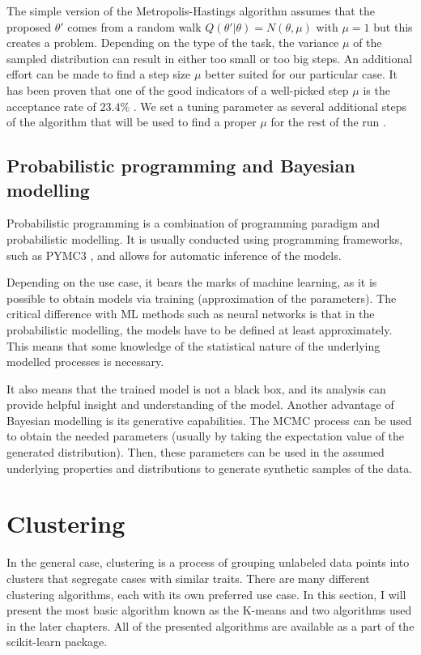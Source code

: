 The simple version of the Metropolis-Hastings algorithm assumes that the proposed $\theta\prime$ comes from a random walk $Q(\theta'|\theta)=N(\theta, \mu)$ with $\mu=1$ but this creates a problem.
Depending on the type of the task, the variance $\mu$ of the sampled distribution can result in either too small or too big steps.
An additional effort can be made to find a step size $\mu$ better suited for our particular case.
It has been proven that one of the good indicators of a well-picked step $\mu$ is the acceptance rate of $23.4\%$ \cite{10.1214/aoap/1034625254}.
We set a tuning parameter as several additional steps of the algorithm that will be used to find a proper $\mu$ for the rest of the run \cite{colin_carroll_2019}.

\subsection{Probabilistic programming and Bayesian modelling}

Probabilistic programming is a combination of programming paradigm and probabilistic modelling.
It is usually conducted using programming frameworks, such as PYMC3 \cite{Salvatier2016}, and allows for automatic inference of the models.

Depending on the use case, it bears the marks of machine learning, as it is possible to obtain models via training (approximation of the parameters).
The critical difference with ML methods such as neural networks is that in the probabilistic modelling, the models have to be defined at least approximately.
This means that some knowledge of the statistical nature of the underlying modelled processes is necessary.

It also means that the trained model is not a black box, and its analysis can provide helpful insight and understanding of the model.
Another advantage of Bayesian modelling is its generative capabilities.
The MCMC process can be used to obtain the needed parameters (usually by taking the expectation value of the generated distribution).
Then, these parameters can be used in the assumed underlying properties and distributions to generate synthetic samples of the data.

\section{Clustering}
\label{sec:clustering}

In the general case, clustering is a process of grouping unlabeled data points into clusters that segregate cases with similar traits. There are many different clustering algorithms, each with its own preferred use case. In this section, I will present the most basic algorithm known as the K-means and two algorithms used in the later chapters. All of the presented algorithms are available as a part of the scikit-learn \cite{scikit-learn} package.

